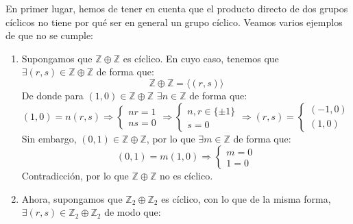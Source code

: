 \begin{ejemplo}
    En primer lugar, hemos de tener en cuenta que el producto directo de dos grupos cíclicos no tiene por qué ser en general un grupo cíclico. Veamos varios ejemplos de que no se cumple:
    \begin{enumerate}
        \item Supongamos que $\mathbb{Z}\oplus\mathbb{Z}$ es cíclico. En cuyo caso, tenemos que $\exists (r,s)\in \mathbb{Z}\oplus\mathbb{Z}$ de forma que:
            \begin{equation*}
                \mathbb{Z}\oplus\mathbb{Z} = \langle (r,s) \rangle 
            \end{equation*}
            De donde para $(1,0)\in \mathbb{Z}\oplus\mathbb{Z}$ $\exists n\in \mathbb{Z}$ de forma que:
            \begin{equation*}
                (1, 0) = n(r,s) \Longrightarrow \left\{\begin{array}{l}
                    nr = 1 \\
                    ns = 0
                \end{array}\right. \Longrightarrow \left\{\begin{array}{l}
                    n,r \in \{\pm 1\} \\
                    s = 0 
                \end{array}\right. \Longrightarrow (r,s) = \left\{\begin{array}{l}
                (-1, 0) \\
                (1, 0)
                \end{array}\right.
            \end{equation*}
            Sin embargo, $(0,1)\in \mathbb{Z}\oplus \mathbb{Z}$, por lo que $\exists m\in \mathbb{Z}$ de forma que:
            \begin{equation*}
                (0,1) = m(1,0) \Longrightarrow \left\{\begin{array}{l}
                    m = 0 \\
                    1 = 0
                \end{array}\right.
            \end{equation*}
            Contradicción, por lo que $\mathbb{Z}\oplus \mathbb{Z}$ no es cíclico.
        \item Ahora, supongamos que $\mathbb{Z}_2\oplus\mathbb{Z}_2$ es cíclico, con lo que de la misma forma, $\exists (r,s)\in \mathbb{Z}_2\oplus\mathbb{Z}_2$ de modo que:
            \begin{equation*}

\end{equation*}
\end{enumerate}
\end{ejemplo}
